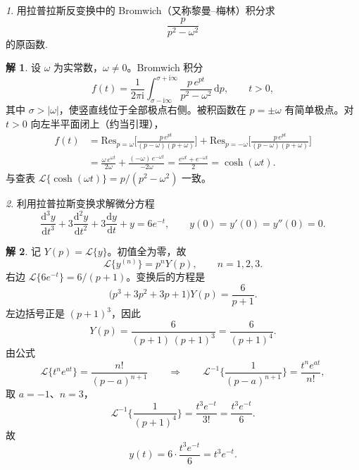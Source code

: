 \documentclass[11pt]{article}
\theoremstyle{remark}
\newtheorem{problem}{}
\theoremstyle{definition}
\newtheorem{solution}{解}
\begin{document}
\begin{problem}
用拉普拉斯反变换中的 Bromwich（又称黎曼--梅林）积分求
\[
\frac{p}{p^2-\omega^2}
\]
的原函数.
\end{problem}

\begin{solution}
设 $\omega$ 为实常数，$\omega\neq 0$。Bromwich 积分
\[
f(t)
=\frac{1}{2\pi\mathrm{i}}
\int_{\sigma-\mathrm{i}\infty}^{\sigma+\mathrm{i}\infty}
\frac{p\,e^{pt}}{p^2-\omega^2}\,\mathrm{d}p,
\qquad t>0,
\]
其中 $\sigma>|\omega|$，使竖直线位于全部极点右侧。被积函数在
$p=\pm\omega$ 有简单极点。对 $t>0$ 向左半平面闭上（约当引理），
\begin{align*}
f(t)
&=\mathrm{Res}_{p=\omega}
  \Biggl[\frac{p\,e^{pt}}{(p-\omega)(p+\omega)}\Biggr]
+\mathrm{Res}_{p=-\omega}
  \Biggl[\frac{p\,e^{pt}}{(p-\omega)(p+\omega)}\Biggr]
\\
&=\frac{\omega\,e^{\omega t}}{2\omega}
+\frac{(-\omega)\,e^{-\omega t}}{-2\omega}
=\frac{e^{\omega t}+e^{-\omega t}}{2}
=\cosh(\omega t).
\end{align*}
与查表 $\mathcal{L}\{\cosh(\omega t)\}=p/(p^2-\omega^2)$ 一致。
\end{solution}

\begin{problem}
  利用拉普拉斯变换求解微分方程
  \[
  \frac{\mathrm{d}^3 y}{\mathrm{d}t^3}
  +3\frac{\mathrm{d}^2 y}{\mathrm{d}t^2}
  +3\frac{\mathrm{d} y}{\mathrm{d}t}
  +y
  =6e^{-t},
  \qquad
  y(0)=y'(0)=y''(0)=0.
  \]
\end{problem}

\begin{solution}
记 $Y(p)=\mathcal{L}\{y\}$。初值全为零，故
\[
\mathcal{L}\{y^{(n)}\}=p^n Y(p),\qquad n=1,2,3.
\]
右边 $\mathcal{L}\{6e^{-t}\}=6/(p+1)$。变换后的方程是
\[
\bigl(p^3+3p^2+3p+1\bigr)Y(p)=\frac{6}{p+1}.
\]
左边括号正是 $(p+1)^3$，因此
\[
Y(p)
=\frac{6}{(p+1)\,(p+1)^3}
=\frac{6}{(p+1)^4}.
\]
由公式
\[
\mathcal{L}\bigl\{t^n e^{at}\bigr\}
=\frac{n!}{(p-a)^{n+1}}
\qquad\Longrightarrow\qquad
\mathcal{L}^{-1}\Biggl\{\frac{1}{(p-a)^{n+1}}\Biggr\}
=\frac{t^n e^{at}}{n!},
\]
取 $a=-1$、$n=3$，
\[
\mathcal{L}^{-1}\Biggl\{\frac{1}{(p+1)^4}\Biggr\}
=\frac{t^3 e^{-t}}{3!}=\frac{t^3 e^{-t}}{6}.
\]
故
\[
y(t)=6\cdot\frac{t^3 e^{-t}}{6}=t^3 e^{-t}.
\]
\end{solution}
\end{document}
